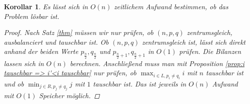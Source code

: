 \documentclass[12pt]{article}
\newtheorem{cor}[thm]{Korollar}
\begin{document}
\begin{cor}
Es lässt sich in $O(n)$ zeitlichem Aufwand bestimmen, ob das Problem lösbar ist.
\begin{proof}
Nach Satz \ref{thm} müssen wir nur prüfen, ob $(n, p, q)$ zentrumsgleich, ausbalanciert und tauschbar ist.
Ob $(n,p,q)$ zentrumsgleich ist, lässt sich direkt anhand der beiden Werte $p_{\frac{n}{2}}, q_{\frac{n}{2}}$ und $p_{\frac{n}{2}+1}, q_{\frac{n}{2}+1}$ in $O(1)$ prüfen. Die Bilanzen lassen sich in $O(n)$ berechnen. Anschließend muss man mit Proposition \ref{prop:i tauschbar => i'<i tauschbar} nur prüfen, ob $\max_{i\in L, p_i\neq q_i} i$ mit $n$ tauschbar ist und  ob $\min_{j\in R, p_j\neq q_j} j$ mit $1$ tauschbar ist. Das ist jeweils in $O(n)$ Aufwand mit $O(1)$ Speicher möglich.
\end{proof}
\end{cor}
\end{document}
